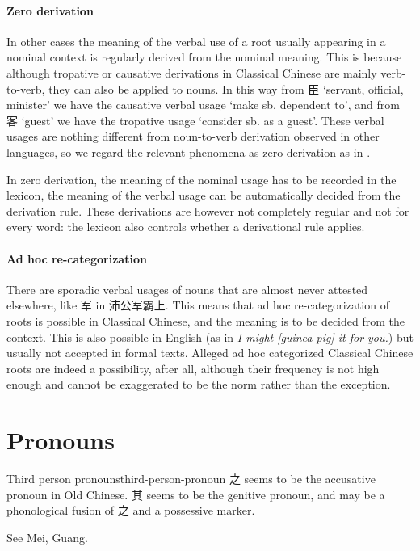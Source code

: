 \documentclass[UTF8, a4paper, oneside, scheme=plain, 12pt]{ctexrep}
\newcommand*{\citesec}[1]{\S~{#1}}
\newcommand{\form}[1]{\emph{#1}}
\newcommand{\translate}[1]{`#1'}
\begin{document}
\paragraph*{Zero derivation}
In other cases the meaning of the verbal use of a root usually appearing in a nominal context
is regularly derived from the nominal meaning.
This is because although tropative or causative derivations in Classical Chinese
are mainly verb-to-verb,
they can also be applied to nouns.
In this way from 臣 \translate{servant, official, minister}
we have the causative verbal usage \translate{make sb. dependent to},
and from 客 \translate{guest} we have the tropative usage \translate{consider sb. as a guest}.
These verbal usages are nothing different from noun-to-verb derivation observed in other languages,
so we regard the relevant phenomena as zero derivation as in \citet[\citesec{11.3}]{dixon2010basic2}.

In zero derivation, the meaning of the nominal usage has to be recorded in the lexicon,
the meaning of the verbal usage can be automatically decided from the derivation rule.
These derivations are however not completely regular and not for every word:
the lexicon also controls whether a derivational rule applies.

\paragraph*{Ad hoc re-categorization}
There are sporadic verbal usages of nouns that are almost never attested elsewhere,
like 军 in 沛公军霸上.
This means that ad hoc re-categorization of roots is possible in Classical Chinese,
and the meaning is to be decided from the context.
This is also possible in English
(as in \form{I might [guinea pig] it for you.}) 
but usually not accepted in formal texts.
Alleged ad hoc categorized Classical Chinese roots are indeed a possibility, after all,
although their frequency is not high enough and cannot be exaggerated to be the norm rather than the exception.

\section{Pronouns}

\begin{todobox}{Third person pronouns}{third-person-pronoun}
    之 seems to be the accusative pronoun in Old Chinese.
    其 seems to be the genitive pronoun,
    and may be a phonological fusion of 之 and a possessive marker.
    
    See Mei, Guang.
\end{todobox}
\end{document}

